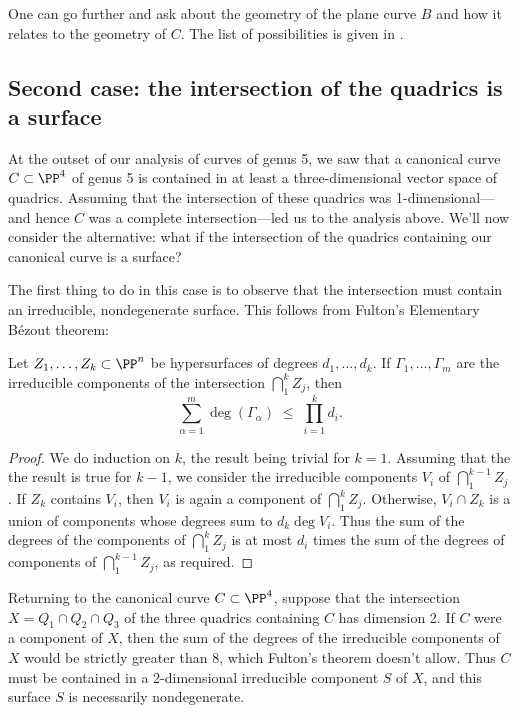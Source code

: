 One can go further and ask about the geometry of the plane curve $B$ and how it relates to the geometry of $C$. The list of possibilities is given in \cite[p. 274]{ACGH}. 

\subsection{Second case: the intersection of the quadrics is a surface}\label{trigonal genus 5}

At the outset of our analysis of curves of genus 5, we saw that a canonical curve $C \subset \PP^4$ of genus 5 is contained in at least a three-dimensional vector space of quadrics. Assuming that the intersection of these quadrics was 1-dimensional---and hence $C$ was a complete intersection---led us to the analysis above. We'll now consider the alternative: what if the intersection of the quadrics containing our canonical curve is a surface?

The first thing to do in this case is to observe that the intersection must contain an irreducible, nondegenerate surface. This  follows from Fulton's Elementary B\'ezout  theorem:

\begin{theorem}\cite[]{Fulton}
Let $Z_1,\dots, Z_k \subset \PP^n$ be hypersurfaces of degrees $d_1,\dots,d_k$. If $\Gamma_1,\dots,\Gamma_m$ are the irreducible components of the intersection $\bigcap_1^kZ_j$, then
$$
\sum_{\alpha = 1}^m \deg(\Gamma_\alpha) \; \leq \; \prod_{i=1}^k d_i.
$$
\end{theorem}

\begin{proof}
We do induction on $k$, the result being trivial for $k=1$. Assuming that the the result
is true for $k-1$, we consider the irreducible components $V_i$ of $\bigcap_1^{k-1}Z_j$. If $Z_k$ contains
$V_i$, then $V_i$ is again a component of $\bigcap_1^kZ_j$. Otherwise,
$V_i\cap Z_k$ is a union of components whose degrees sum to $d_k\deg V_i$. Thus
the sum of the degrees of the components of $\bigcap_1^kZ_j$ is at most $d_i$ times the
sum of the degrees of components of $\bigcap_1^{k-1}Z_j$, as required.
\end{proof}

Returning to the canonical curve $C \subset \PP^4$, suppose that the intersection $X = Q_1 \cap Q_2 \cap Q_3$ of the three quadrics containing $C$ has dimension 2. If $C$ were a component of $X$, then the sum of the degrees of the irreducible components of $X$ would be strictly greater than 8, which Fulton's theorem doesn't allow. Thus $C$ must be contained in a 2-dimensional irreducible component  $S$ of $X$, and this surface $S$ is necessarily nondegenerate.


